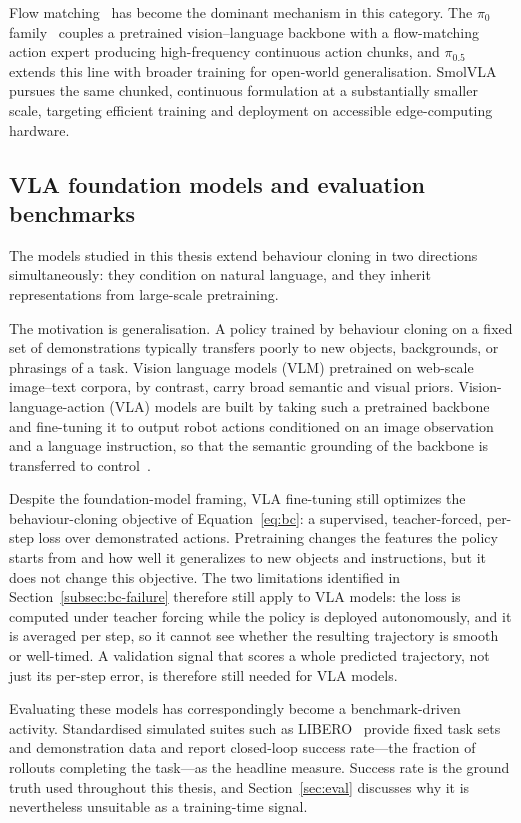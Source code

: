 \documentclass[english,12pt,a4paper,pdftex,elec,utf8]{aaltothesis}
\begin{document}
Flow matching~\cite{lipman2023flow} has become the dominant mechanism in this category. The $\pi_0$ family~\cite{black2024pi0} couples a pretrained vision--language backbone with a flow-matching action expert producing high-frequency continuous action chunks, and $\pi_{0.5}$ \citep{intelligence2025pi05} extends this line with broader training for open-world generalisation. SmolVLA~\cite{shukor2025smolvla} pursues the same chunked, continuous formulation at a substantially smaller scale, targeting efficient training and deployment on accessible edge-computing hardware.

\subsection{VLA foundation models and evaluation benchmarks}
\label{sec:vla-foundation}

The models studied in this thesis extend behaviour cloning in two directions simultaneously: they condition on natural language, and they inherit representations from large-scale pretraining.

The motivation is generalisation. A policy trained by behaviour cloning on a fixed set of demonstrations typically transfers poorly to new objects, backgrounds, or phrasings of a task. Vision language models (VLM) pretrained on web-scale image--text corpora, by contrast, carry broad semantic and visual priors. Vision-language-action (VLA) models are built by taking such a pretrained backbone and fine-tuning it to output robot actions conditioned on an image observation and a language instruction, so that the semantic grounding of the backbone is transferred to control~\cite{brohan2023rt2}.

Despite the foundation-model framing, VLA fine-tuning still optimizes the behaviour-cloning objective of Equation~\eqref{eq:bc}: a supervised, teacher-forced, per-step loss over demonstrated actions. Pretraining changes the features the policy starts from and how well it generalizes to new objects and instructions, but it does not change this objective. The two limitations identified in Section~\ref{subsec:bc-failure} therefore still apply to VLA models: the loss is computed under teacher forcing while the policy is deployed autonomously, and it is averaged per step, so it cannot see whether the resulting trajectory is smooth or well-timed. A validation signal that scores a whole predicted trajectory, not just its per-step error, is therefore still needed for VLA models.

Evaluating these models has correspondingly become a benchmark-driven activity. Standardised simulated suites such as LIBERO~\cite{liu2023libero} provide fixed task sets and demonstration data and report closed-loop success rate---the fraction of rollouts completing the task---as the headline measure. Success rate is the ground truth used throughout this thesis, and Section~\ref{sec:eval} discusses why it is nevertheless unsuitable as a training-time signal.
\end{document}
